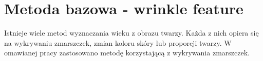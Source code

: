 \documentclass[a4paper,twoside,12pt]{book}
\begin{document}

    \chapter{Metoda bazowa - wrinkle feature}
    Istnieje wiele metod wyznaczania wieku z obrazu twarzy. Każda z nich opiera się na wykrywaniu zmarszczek,
    zmian koloru skóry lub proporcji twarzy. W omawianej pracy zastosowano metodę korzystającą z wykrywania zmarszczek.
    ~\cite{Kriegman}
\end{document}
